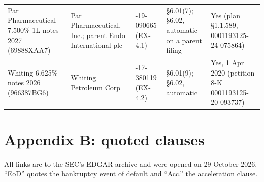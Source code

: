 \documentclass[11pt]{article}
\begin{document}
\begin{table}[H]
\begin{tabularx}{\textwidth}{@{}>{\raggedright\arraybackslash}p{2.9cm} >{\raggedright\arraybackslash}p{2.6cm} >{\raggedright\arraybackslash}X >{\raggedright\arraybackslash}p{2.1cm} >{\raggedright\arraybackslash}X@{}}
Par Pharmaceutical 7.500\% 1L notes 2027 (69888XAA7) & Par Pharmaceutical, Inc.; parent Endo International plc & 0001193125-19-090665 (EX-4.1) & \S6.01(7); \S6.02, automatic on a parent filing & Yes (plan \S1.1.589, 0001193125-24-075864) \\
Whiting 6.625\% notes 2026 (966387BG6) & Whiting Petroleum Corp & 0001193125-17-380119 (EX-4.2) & \S6.01(9); \S6.02, automatic & Yes, 1 Apr 2020 (petition 8-K 0001193125-20-093737) \\
\bottomrule
\end{tabularx}
\end{table}

\section*{Appendix B: quoted clauses}
All links are to the SEC's EDGAR archive and were opened on 29 October 2026. ``EoD'' quotes the
bankruptcy event of default and ``Acc.'' the acceleration clause.
\end{document}
